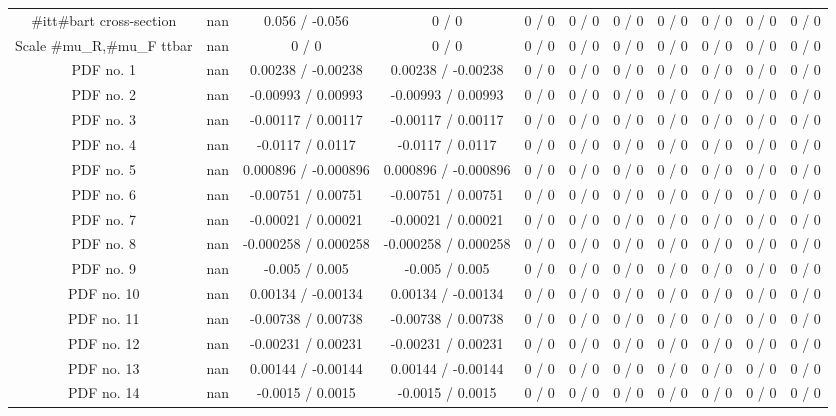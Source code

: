 \begin{table}[htbp]
\begin{center}
\begin{tabular}{|c|c|c|c|c|c|c|c|c|c|c|}
  #it{t#bar{t}} cross-section &    nan    & 0.056 / -0.056 & 0 / 0 & 0 / 0 & 0 / 0 & 0 / 0 & 0 / 0 & 0 / 0 & 0 / 0 & 0 / 0 \\ 
  Scale #mu_{R},#mu_{F} ttbar &    nan    & 0 / 0 & 0 / 0 & 0 / 0 & 0 / 0 & 0 / 0 & 0 / 0 & 0 / 0 & 0 / 0 & 0 / 0 \\ 
  PDF no. 1 &    nan    & 0.00238 / -0.00238 & 0.00238 / -0.00238 & 0 / 0 & 0 / 0 & 0 / 0 & 0 / 0 & 0 / 0 & 0 / 0 & 0 / 0 \\ 
  PDF no. 2 &    nan    & -0.00993 / 0.00993 & -0.00993 / 0.00993 & 0 / 0 & 0 / 0 & 0 / 0 & 0 / 0 & 0 / 0 & 0 / 0 & 0 / 0 \\ 
  PDF no. 3 &    nan    & -0.00117 / 0.00117 & -0.00117 / 0.00117 & 0 / 0 & 0 / 0 & 0 / 0 & 0 / 0 & 0 / 0 & 0 / 0 & 0 / 0 \\ 
  PDF no. 4 &    nan    & -0.0117 / 0.0117 & -0.0117 / 0.0117 & 0 / 0 & 0 / 0 & 0 / 0 & 0 / 0 & 0 / 0 & 0 / 0 & 0 / 0 \\ 
  PDF no. 5 &    nan    & 0.000896 / -0.000896 & 0.000896 / -0.000896 & 0 / 0 & 0 / 0 & 0 / 0 & 0 / 0 & 0 / 0 & 0 / 0 & 0 / 0 \\ 
  PDF no. 6 &    nan    & -0.00751 / 0.00751 & -0.00751 / 0.00751 & 0 / 0 & 0 / 0 & 0 / 0 & 0 / 0 & 0 / 0 & 0 / 0 & 0 / 0 \\ 
  PDF no. 7 &    nan    & -0.00021 / 0.00021 & -0.00021 / 0.00021 & 0 / 0 & 0 / 0 & 0 / 0 & 0 / 0 & 0 / 0 & 0 / 0 & 0 / 0 \\ 
  PDF no. 8 &    nan    & -0.000258 / 0.000258 & -0.000258 / 0.000258 & 0 / 0 & 0 / 0 & 0 / 0 & 0 / 0 & 0 / 0 & 0 / 0 & 0 / 0 \\ 
  PDF no. 9 &    nan    & -0.005 / 0.005 & -0.005 / 0.005 & 0 / 0 & 0 / 0 & 0 / 0 & 0 / 0 & 0 / 0 & 0 / 0 & 0 / 0 \\ 
  PDF no. 10 &    nan    & 0.00134 / -0.00134 & 0.00134 / -0.00134 & 0 / 0 & 0 / 0 & 0 / 0 & 0 / 0 & 0 / 0 & 0 / 0 & 0 / 0 \\ 
  PDF no. 11 &    nan    & -0.00738 / 0.00738 & -0.00738 / 0.00738 & 0 / 0 & 0 / 0 & 0 / 0 & 0 / 0 & 0 / 0 & 0 / 0 & 0 / 0 \\ 
  PDF no. 12 &    nan    & -0.00231 / 0.00231 & -0.00231 / 0.00231 & 0 / 0 & 0 / 0 & 0 / 0 & 0 / 0 & 0 / 0 & 0 / 0 & 0 / 0 \\ 
  PDF no. 13 &    nan    & 0.00144 / -0.00144 & 0.00144 / -0.00144 & 0 / 0 & 0 / 0 & 0 / 0 & 0 / 0 & 0 / 0 & 0 / 0 & 0 / 0 \\ 
  PDF no. 14 &    nan    & -0.0015 / 0.0015 & -0.0015 / 0.0015 & 0 / 0 & 0 / 0 & 0 / 0 & 0 / 0 & 0 / 0 & 0 / 0 & 0 / 0 \\ 

\end{tabular}
\end{center}
\end{table}
